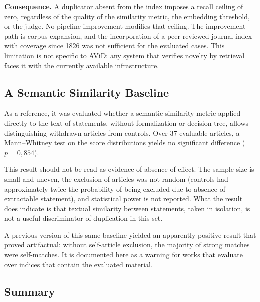 \textbf{Consequence.} A duplicator absent from the index imposes a recall ceiling of zero, regardless of the quality of the similarity metric, the embedding threshold, or the judge. No pipeline improvement modifies that ceiling. The improvement path is corpus expansion, and the incorporation of a peer-reviewed journal index with coverage since 1826 was not sufficient for the evaluated cases. This limitation is not specific to AViD: any system that verifies novelty by retrieval faces it with the currently available infrastructure.

\subsection{A Semantic Similarity Baseline}

As a reference, it was evaluated whether a semantic similarity metric applied directly to the text of statements, without formalization or decision tree, allows distinguishing withdrawn articles from controls. Over 37 evaluable articles, a Mann--Whitney test on the score distributions yields no significant difference ($p = 0{,}854$).

This result should not be read as evidence of absence of effect. The sample size is small and uneven, the exclusion of articles was not random (controls had approximately twice the probability of being excluded due to absence of extractable statement), and statistical power is not reported. What the result does indicate is that textual similarity between statements, taken in isolation, is not a useful discriminator of duplication in this set.

A previous version of this same baseline yielded an apparently positive result that proved artifactual: without self-article exclusion, the majority of strong matches were self-matches. It is documented here as a warning for works that evaluate over indices that contain the evaluated material.

\subsection{Summary}

